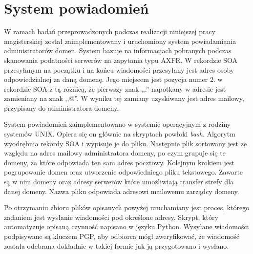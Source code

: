 \section{System powiadomień}
W ramach badań przeprowadzonych podczas realizacji niniejszej pracy magisterskiej został zaimplementowany i uruchomiony system powiadamiania administratorów domen. System bazuje na informacjach pobranych podczas skanowania podatności serwerów na zapytania typu AXFR. W rekordzie SOA przesyłanym na początku i na końcu wiadomości przesyłany jest adres osoby odpowiedzialnej za daną domenę. Jego miejscem jest pozycja numer 2. w rekordzie SOA z tą różnicą, że pierwszy znak ,,.'' napotkany w adresie jest zamieniany na znak ,,@''. W wyniku tej zamiany uzyskiwany jest adres mailowy, przypisany do administratora domeny. 

System powiadomień zaimplementowano w systemie operacyjnym z rodziny systemów UNIX. Opiera się on głównie na skryptach powłoki \textit{bash}. Algorytm wyodrębnia rekordy SOA i wypisuje je do pliku. Następnie plik sortowany jest ze względu na adres mailowy administratora domeny, po czym grupuje się te domeny, za które odpowiada ten sam adres pocztowy. Kolejnym krokiem jest pogrupowanie domen oraz utworzenie odpowiedniego pliku tekstowego. Zawarte są w nim domeny oraz adresy serwerów które umożliwiają transfer strefy dla danej domeny. Nazwa pliku odpowiada adresowi mailowemu zarządcy domeny. 

Po otrzymaniu zbioru plików opisanych powyżej uruchamiany jest proces, którego zadaniem jest wysłanie wiadomości pod określone adresy. Skrypt, który automatyzuje opisaną czynność napisano w języku Python\cite{python}. Wysyłane wiadomości podpisywane są kluczem PGP\cite{}, aby odbiorca mógł zweryfikować, że wiadomość została odebrana dokładnie w takiej formie jak ją przygotowano i wysłano.